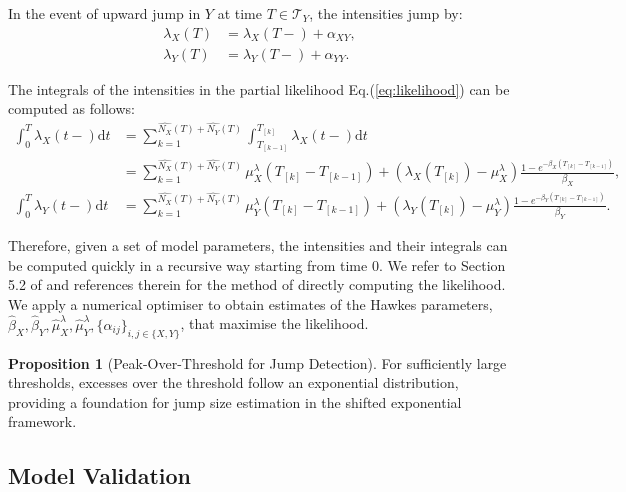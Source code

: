 \documentclass{article}
\newcommand{\diff}{\mathrm{d}}
\theoremstyle{definition}
\newtheorem{proposition}{Proposition}[section]
\begin{document}
In the event of upward jump in $Y$ at time $T \in \mathcal{T}_Y$, the intensities jump by:
\begin{equation}
   \begin{split}
 \lambda_X(T) &= \lambda_X(T-) + \alpha_{XY},\\
 \lambda_Y(T) &= \lambda_Y(T-) + \alpha_{YY}.
   \end{split}
\end{equation}

The integrals of the intensities in the partial likelihood Eq.(\ref{eq:likelihood}) can be computed as follows:
\begin{equation}
   \begin{split}
 \int_0^T\lambda_X(t-)\diff t &= \sum_{k=1}^{\widehat{N_X}(T) + \widehat{N_Y}(T)} \int_{T_{[k-1]}}^{T_{[k]}}\lambda_X(t-)\diff t\\
 &= \sum_{k=1}^{\widehat{N_X}(T) + \widehat{N_Y}(T)} 
\mu_X^\lambda(T_{[k]}-T_{[k-1]})
+\left(\lambda_X(T_{[k]})-\mu_X^\lambda\right)\frac{1-e^{-\beta_X(T_{[k]} - T_{[k-1]})}}{\beta_X},\\ 
\int_0^T\lambda_Y(t-)\diff t&= \sum_{k=1}^{\widehat{N_X}(T) + \widehat{N_Y}(T)} 
\mu_Y^\lambda(T_{[k]}-T_{[k-1]})
+\left(\lambda_Y(T_{[k]})-\mu_Y^\lambda\right)\frac{1-e^{-\beta_Y(T_{[k]} - T_{[k-1]})}}{\beta_Y}.
   \end{split}
\end{equation}

Therefore, given a set of model parameters, the intensities and their integrals can be computed quickly in a recursive way starting from time 0. We refer to Section 5.2 of \cite{laub2021elements} and references therein for the method of directly computing the likelihood.
We apply a numerical optimiser to obtain estimates of the Hawkes parameters, $\hat \beta_X, \hat \beta_Y, \hat \mu_X^\lambda, \hat \mu_Y^\lambda, \{\hat \alpha_{ij}\}_{i,j \in \{X,Y\}}$, that maximise the likelihood.

\begin{proposition}[Peak-Over-Threshold for Jump Detection]
\label{prop:pot}
For sufficiently large thresholds, excesses over the threshold follow an exponential distribution, providing a foundation for jump size estimation in the shifted exponential framework.
\end{proposition}

\subsection{Model Validation}
\end{document}
